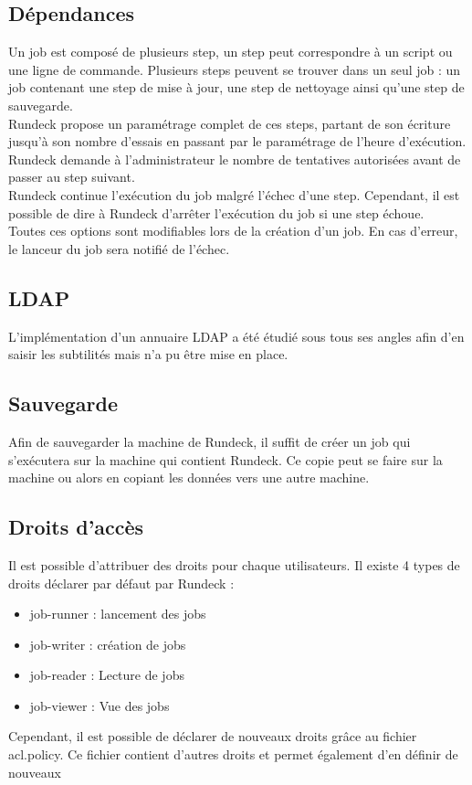 \documentclass[12pt]{article}
\begin{document}
\subsection{Dépendances}
Un job est composé de plusieurs step, un step peut correspondre à un script ou une ligne de commande. Plusieurs steps peuvent se trouver dans un seul job : un job contenant une step de mise à jour, une step de nettoyage ainsi qu'une step de sauvegarde.
\\
Rundeck propose un paramétrage complet de ces steps, partant de son écriture jusqu'à son nombre d'essais en passant par le paramétrage de l'heure d'exécution.
\\
Rundeck demande à l'administrateur le nombre de tentatives autorisées avant de passer au step suivant.
\\
Rundeck continue l'exécution du job malgré l'échec d'une step. Cependant, il est possible de dire à Rundeck d'arrêter l'exécution du job si une step échoue.
\\
Toutes ces options sont modifiables lors de la création d'un job. En cas d'erreur, le lanceur du job sera notifié de l'échec.

\subsection{LDAP}
L'implémentation d'un annuaire LDAP a été étudié sous tous ses angles afin d'en saisir les subtilités mais n'a pu être mise en place.

\subsection{Sauvegarde}
Afin de sauvegarder la machine de Rundeck, il suffit de créer un job qui s'exécutera sur la machine qui contient Rundeck. Ce copie peut se faire sur la machine ou alors en copiant les données vers une autre machine.

\subsection{Droits d'accès}
Il est possible d'attribuer des droits pour chaque utilisateurs. Il existe 4 types de droits déclarer par défaut par Rundeck : 
\begin{itemize}
    \item job-runner : lancement des jobs
    \item job-writer : création de jobs
    \item job-reader : Lecture de jobs
    \item job-viewer : Vue des jobs
\end{itemize}
Cependant, il est possible de déclarer de nouveaux droits grâce au fichier acl.policy. Ce fichier contient d'autres droits et permet également d'en définir de nouveaux
\end{document}

